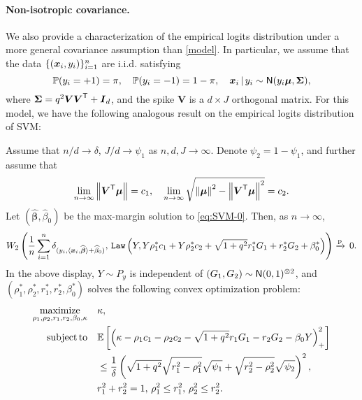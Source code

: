 \paragraph{Non-isotropic covariance.} We also provide a characterization of the empirical logits distribution under a more general covariance assumption than \eqref{model}. In particular, we assume that the data $\{ (\text{\boldmath $x$}_i, y_i) \}_{i = 1}^{n}$ are i.i.d. satisfying
\begin{equation}\label{spiked_model}
    \mathbb{P}(y_i = +1) = \pi, \quad \mathbb{P}(y_i = -1) = 1 - \pi, \quad \text{\boldmath $x$}_i \,|\, y_i \sim {\sf N}(y_i \text{\boldmath $\mu$}, \boldsymbol{\Sigma}),
\end{equation}
where $\boldsymbol{\Sigma} = q^2 \boldsymbol{V} \boldsymbol{V}^{\sf T} + {\boldsymbol I}_d$, and the spike $\boldsymbol{V}$ is a $d \times J$ orthogonal matrix. For this model, we have the following analogous result on the empirical logits distribution of SVM:
\begin{conj}
    Assume that $n/d \to \delta$,  $J/d \to \psi_1$ as $n, d, J \to \infty$. Denote $\psi_2 = 1 - \psi_1$, and further assume that
    \begin{equation*}
        \lim_{n \to \infty} \left\|{\boldsymbol{V}^{\sf T} \text{\boldmath $\mu$}}\right\| = c_1, \quad \lim_{n \to \infty} \sqrt{ \left\|{\boldsymbol{\mu}}\right\|^2 - \left\|{\boldsymbol{V}^{\sf T} \text{\boldmath $\mu$}}\right\|^2 } = c_2.
    \end{equation*}
    Let $(\hat{\boldsymbol{\beta}}, \hat{\beta}_0)$ be the max-margin solution to \cref{eq:SVM-0}. Then, as $n \to \infty$, 
    \begin{equation*}
        W_2 \left( \frac{1}{n} \sum_{i=1}^{n} \delta_{( y_i, \langle\text{\boldmath $x$}_i, \widehat{\boldsymbol{\beta}}\rangle + \widehat{\beta}_0 )}, \, \mathtt{Law} \left( Y, Y \rho_1^* c_1 + Y \rho_2^* c_2 + \sqrt{1 + q^2} r_1^* G_1 + r_2^* G_2 + \beta_0^* \right) \right) \xrightarrow{\mathrm{p}} \, 0.
    \end{equation*}
    In the above display, $Y \sim P_y$ is independent of $(G_1, G_2) \sim {\sf N}(0, 1)^{\otimes 2}$, and $(\rho_1^*, \rho_2^*, r_1^*, r_2^*, \beta_0^*)$ solves the following convex optimization problem:
    \begin{equation}\label{spike_covariance_opt}
    \begin{split}
        \operatorname*{\mathrm{maximize}}_{\rho_1, \rho_2, r_1, r_2, \beta_0, \kappa} \quad & \kappa, \\
        \mathrm{subject \, to} \quad & \mathbb{E} \left[ \left( \kappa - \rho_1 c_1 - \rho_2 c_2 - \sqrt{1 + q^2} r_1 G_1 - r_2 G_2 - \beta_0 Y \right)_+^2 \right] \\
        & \le \frac{1}{\delta} \left( \sqrt{1 + q^2} \sqrt{r_1^2 - \rho_1^2} \sqrt{\psi_1} + \sqrt{r_2^2 - \rho_2^2} \sqrt{\psi_2} \right)^2, \\
        & r_1^2 + r_2^2 = 1, \, \rho_1^2 \le r_1^2, \, \rho_2^2 \le r_2^2.
    \end{split}
    \end{equation}
\end{conj}


